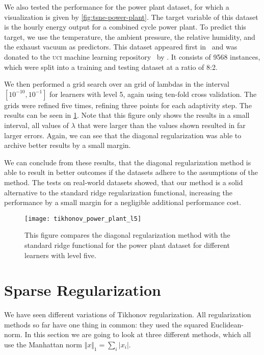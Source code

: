 We also tested the performance for the power plant dataset, for which a visualization is given by \cref{fig:tsne-power-plant}.
The target variable of this dataset is the hourly energy output for a combined
cycle power plant.
To predict this target, we use the temperature, the ambient pressure, the
relative humidity, and the exhaust vacuum as predictors.
This dataset appeared first in~\cite{datasets-powerplant} and was donated to the
\textsc{uci} machine learning repository~\cite{datasets-uci} by \citeauthor{datasets-powerplant}.
It consists of 9568 instances, which were split into a training and testing
dataset at a ratio of 8:2.

We then performed a grid search over an grid of lambdas in the interval
\([10^{-10}, 10^{-1}]\) for learners with level 5, again using ten-fold cross validation.
The grids were refined five times, refining three points for each adaptivity step.
The results can be seen in \cref{fig:tikhonov-power-plant-l5}.
Note that this figure only shows the results in a small interval, all values of
\(\lambda\) that were larger than the values shown resulted in far larger
errors.
Again, we can see that the diagonal regularization was able to archive better
results by a small margin.

We can conclude from these results, that the diagonal regularization method is
able to result in better outcomes if the datasets adhere to the assumptions of
the method.
The tests on real-world datasets showed, that our method is a solid alternative
to the standard ridge regularization functional, increasing the performance by a
small margin for a negligible additional performance cost.

\begin{figure}[htb]
  \centering
  \texttt{[image: tikhonov\_power\_plant\_l5]}
  \caption{This figure compares the diagonal regularization method with the
    standard ridge functional for the power plant dataset for different learners
  with level five.}
  \label{fig:tikhonov-power-plant-l5}
\end{figure}
\FloatBarrier{}
\section{Sparse Regularization}
We have seen different variations of Tikhonov regularization.
All regularization methods so far have one thing in common: they used the squared Euclidean-norm.
In this section we are going to look at three different methods, which all use the Manhattan norm \(\Vert x \Vert_1  = \sum_i \vert x_i \vert\).

